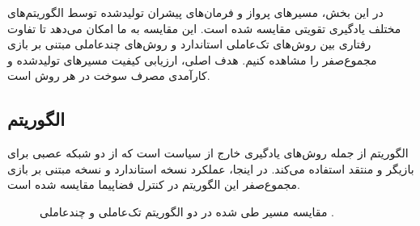 در این بخش، مسیرهای پرواز و فرمان‌های پیشران تولیدشده توسط الگوریتم‌های مختلف یادگیری تقویتی مقایسه شده است. این مقایسه به ما امکان می‌دهد تا تفاوت رفتاری بین روش‌های تک‌عاملی استاندارد و روش‌های چندعاملی مبتنی بر بازی مجموع‌صفر را مشاهده کنیم. هدف اصلی، ارزیابی کیفیت مسیرهای تولیدشده و کارآمدی مصرف سوخت در هر روش است.

\subsection{الگوریتم }

الگوریتم   از جمله روش‌های یادگیری خارج از سیاست است که از دو شبکه عصبی برای بازیگر و منتقد استفاده می‌کند. در اینجا، عملکرد نسخه استاندارد و نسخه مبتنی بر بازی مجموع‌صفر این الگوریتم در کنترل فضاپیما مقایسه شده است.

\begin{figure}[H]
	\centering
	
	
	\caption{
		مقایسه مسیر طی شده در دو الگوریتم تک‌عاملی و چندعاملی .
	}
\end{figure}


